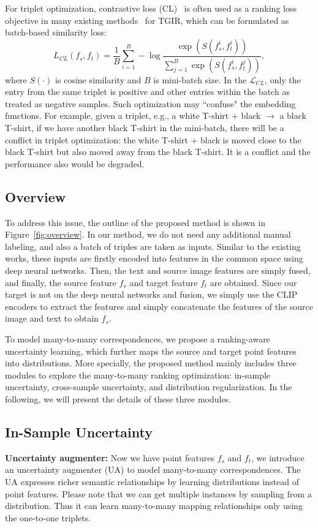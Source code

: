 \documentclass[letterpaper]{article} \usepackage{aaai24}  \usepackage{times}  \usepackage{helvet}  \usepackage{courier}  \usepackage[hyphens]{url}  \usepackage{graphicx} \urlstyle{rm} \def\UrlFont{\rm}  \usepackage{natbib}  \usepackage{caption} \frenchspacing  \setlength{\pdfpagewidth}{8.5in} \setlength{\pdfpageheight}{11in} \usepackage{amsmath,amsfonts}
\begin{document}
For triplet optimization, contrastive loss (CL)~\cite{chen2020simcl} is often used as a ranking loss objective in many existing methods~\cite{TIRG, 2021CoSMo, CLIP4Cir} for TGIR, which can be formulated as batch-based similarity loss:
\begin{equation}
        L_{CL}{ ( f_ s , f_ t ) }=\frac1B\sum_{i=1}^B-\log\frac{\exp\left(S\left(f_s^i,f_t^i\right)\right)}{\sum_{j=1}^B\exp\left(S\left(f_s^i,f_t^j\right)\right)},
\end{equation}
where $S(\cdot)$ is cosine similarity and $B$ is mini-batch size. In the $\mathcal{L}_{CL}$, only the entry from the same triplet is positive and other entries within the batch as treated as negative samples. Such optimization may ``confuse" the  embedding functions. For example, given a triplet, e.g., a white T-shirt + black $\to$ a black T-shirt, if we have another black T-shirt in the mini-batch, there will be a conflict in triplet optimization: the white T-shirt + black is moved close to the black T-shirt but also moved away from the black T-shirt. It is a conflict and the performance also would be degraded. 


\subsection{Overview}

To address this issue, the outline of the proposed method is shown in Figure~\ref{fig:overview}. In our method, we do not need any additional manual labeling, and also a batch of triples are taken as inputs. Similar to the existing works, these inputs are firstly encoded into features in the common space using deep neural networks. Then, the text and source image features are simply fused, and finally, the source feature $f_s$ and target feature $f_t$ are obtained. Since our target is not on the deep neural networks and fusion, we simply use the CLIP encoders to extract the features and simply concatenate the features of the source image and text to obtain $f_s$.  

To model many-to-many correspondences, we propose a ranking-aware uncertainty learning, which further maps the source and target point features into distributions. More specially, the proposed method mainly includes three modules to explore the many-to-many ranking optimization: in-sample uncertainty, cross-sample uncertainty, and distribution regularization. In the following, we will present the details of these three modules. 


\subsection{In-Sample Uncertainty}
\textbf{Uncertainty augmenter:} Now we have point features $f_s$ and $f_t$, we introduce an uncertainty augmenter (UA) to model many-to-many correspondences. 
The UA expresses richer semantic relationships by learning distributions instead of point features. Please note that we can get multiple instances by sampling from a distribution. Thus it can learn many-to-many mapping relationships only using the one-to-one triplets. 
\end{document}
